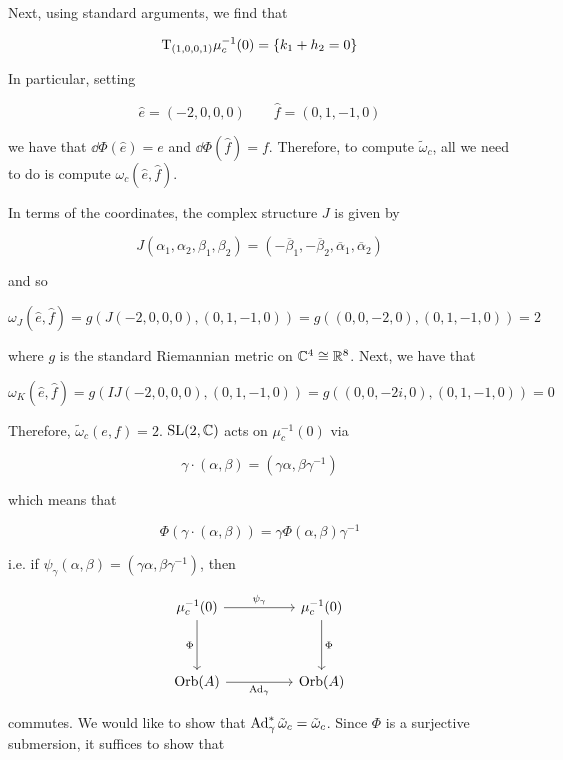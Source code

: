 \documentclass{article}
\begin{document}
Next, using standard arguments, we find that

\[\mathrm{T}_{(1, 0, 0, 1)}\mu_c^{-1}(0) = \left\{k_1 + h_2 = 0\right\}\]

In particular, setting

\[\hat e = (-2, 0, 0, 0) \qquad \hat f = (0, 1, -1, 0)\]

we have that \(\dd\Phi(\hat e) = e\) and \(\dd\Phi(\hat f) = f\). Therefore, to compute \(\tilde\omega_c\), all we need to do is compute \(\omega_c(\hat e, \hat f)\).

In terms of the coordinates, the complex structure \(J\) is given by

\[J(\alpha_1, \alpha_2, \beta_1, \beta_2) = (-\overline \beta_1, -\overline\beta_2, \overline \alpha_1, \overline \alpha_2)\]

and so

\[\omega_J(\hat e, \hat f) = g(J(-2, 0, 0, 0), (0, 1, -1, 0)) = g((0, 0, -2, 0), (0, 1, -1, 0)) = 2\]

where \(g\) is the standard Riemannian metric on \(\mathbb{C}^4 \cong \mathbb{R}^8\). Next, we have that

\[\omega_K(\hat e, \hat f) = g(IJ(-2, 0, 0, 0), (0, 1, -1, 0)) = g((0, 0, -2i, 0), (0, 1, -1, 0)) = 0\]

Therefore, \(\tilde \omega_c(e, f) = 2\). \(\operatorname{SL}(2, \mathbb{C})\) acts on \(\mu_c^{-1}(0)\) via

\[\gamma \cdot (\alpha, \beta) = (\gamma\alpha, \beta \gamma^{-1})\]

which means that

\[\Phi(\gamma \cdot (\alpha, \beta)) = \gamma\Phi(\alpha, \beta)\gamma^{-1}\]

i.e. if \(\psi_\gamma(\alpha, \beta) = (\gamma\alpha, \beta \gamma^{-1})\), then

\[\begin{tikzcd}[ampersand replacement=\&]
	{\mu_c^{-1}(0)} \&\& {\mu_c^{-1}(0)} \\
	\\
	{\Orb(A)} \&\& {\Orb(A)}
	\arrow["\Phi"', from=1-1, to=3-1]
	\arrow["\Phi", from=1-3, to=3-3]
	\arrow["{\psi_\gamma}", from=1-1, to=1-3]
	\arrow["{\Ad_\gamma}"', from=3-1, to=3-3]
\end{tikzcd}\]

commutes. We would like to show that \(\operatorname{Ad}_\gamma^*\tilde\omega_c = \tilde\omega_c\). Since \(\Phi\) is a surjective submersion, it suffices to show that
\end{document}
